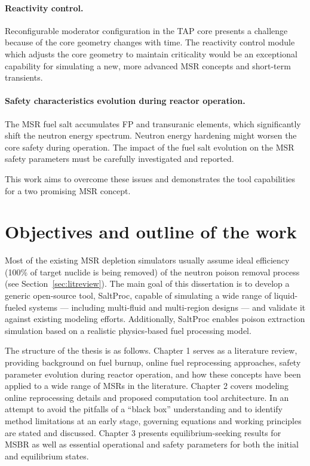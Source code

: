 \paragraph{Reactivity control.} Reconfigurable moderator configuration in the 
\gls{TAP} core presents a challenge because of the core geometry changes with 
time. The reactivity control module which adjusts the core geometry 
to maintain criticality would be an exceptional capability for simulating a 
new, more advanced \gls{MSR} concepts and short-term transients.
\paragraph{Safety characteristics evolution during reactor operation.} The 
\gls{MSR} fuel salt  accumulates \gls{FP} and transuranic elements, which 
significantly shift the neutron energy spectrum. Neutron energy hardening 
might worsen the core safety during operation. The impact of the fuel salt 
evolution on the \gls{MSR} safety parameters must be carefully investigated 
and reported.

This work aims to overcome these issues and demonstrates the tool capabilities 
for a two promising \gls{MSR} concept.


\section{Objectives and outline of the work}
Most of the existing \gls{MSR} depletion simulators usually assume ideal  
efficiency (100\% of target nuclide is being removed) of the neutron poison 
removal process (see Section~\ref{sec:litreview}). The main goal of this 
dissertation is to develop a generic open-source tool, SaltProc, capable of 
simulating a wide range of liquid-fueled systems --- including multi-fluid and 
multi-region designs --- and validate it against existing modeling efforts. 
Additionally, SaltProc enables poison extraction simulation based on a  
realistic physics-based fuel processing model. 

The structure of the thesis is as follows. Chapter 1 serves as a literature 
review, providing background on fuel burnup, online fuel reprocessing  
approaches, safety parameter evolution during reactor operation, and how these 
concepts have been applied to a wide range of \glspl{MSR} in the literature. 
Chapter 2 covers modeling online reprocessing details and proposed computation 
tool architecture. In an attempt to avoid the pitfalls of a ``black box''  
understanding and to identify method limitations at an early stage, governing 
equations and working principles are stated and discussed. Chapter 3 presents 
equilibrium-seeking results for \gls{MSBR} as well as essential operational 
and safety parameters for both the initial and equilibrium states.

